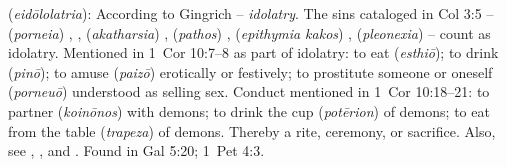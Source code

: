 \item[Idolatry,]

(\textit{eidōlolatria}):
According to Gingrich -- \emph{idolatry}. The sins cataloged in Col 3:5 --  (\emph{porneia}) , , (\emph{akatharsia}) ,  (\emph{pathos}) ,  (\emph{epithymia kakos}) ,  (\emph{pleonexia})  -- count as idolatry. Mentioned in 1~Cor 10:7--8 as part of idolatry: to eat  (\emph{esthiō}); to drink  (\emph{pinō}); to amuse  (\emph{paizō}) erotically or festively; to prostitute someone or oneself  (\emph{porneuō}) understood as selling sex. Conduct mentioned in 1~Cor 10:18--21: to partner  (\emph{koinōnos}) with demons; to drink the cup  (\emph{potērion}) of demons; to eat from the table  (\emph{trapeza}) of demons. Thereby a rite, ceremony, or sacrifice. Also, see , , and .
Found in Gal 5:20; 1~Pet 4:3.
